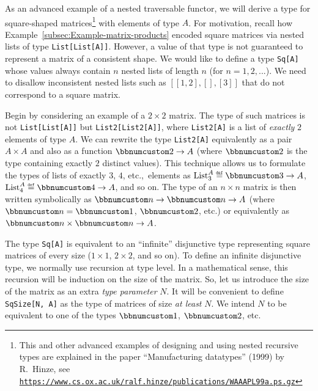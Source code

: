 As an advanced example of a nested traversable functor, we will derive
a type for square-shaped matrices\footnote{This and other advanced examples of designing and using nested recursive
types are explained in the paper \textsf{``}Manufacturing datatypes\textsf{''} (1999)
by R.~Hinze, see \texttt{\href{https://www.cs.ox.ac.uk/ralf.hinze/publications/WAAAPL99a.ps.gz}{https://www.cs.ox.ac.uk/ralf.hinze/publications/WAAAPL99a.ps.gz}}} with elements of type $A$. For motivation, recall how Example~\ref{subsec:Example-matrix-products}
encoded square matrices via nested lists of type \lstinline!List[List[A]]!.
However, a value of that type is not guaranteed to represent a matrix
of a consistent shape. We would like to define a type \lstinline!Sq[A]!
whose values always contain $n$ nested lists of length $n$ (for
$n=1,2,...$). We need to disallow inconsistent nested lists such
as $\left[\left[1,2\right],\left[\right],\left[3\right]\right]$ that
do not correspond to a square matrix.

Begin by considering an example of a $2\times2$ matrix. The type
of such matrices is not \lstinline!List[List[A]]! but \lstinline!List2[List2[A]]!,
where \lstinline!List2[A]! is a list of \emph{exactly} $2$ elements
of type $A$. We can rewrite the type \lstinline!List2[A]! equivalently
as a pair $A\times A$ and also as a function $\bbnum 2\rightarrow A$
(where $\bbnum 2$ is the type containing exactly $2$ distinct values).
This technique allows us to formulate the types of lists of exactly
$3$, $4$, etc.,~elements as $\text{List}_{3}^{A}\triangleq\bbnum 3\rightarrow A$,
$\text{List}_{4}^{A}\triangleq\bbnum 4\rightarrow A$, and so on.
The type of an $n\times n$ matrix is then written symbolically as
$\bbnum n\rightarrow\bbnum n\rightarrow A$ (where $\bbnum n=\bbnum 1$,
$\bbnum 2$, etc.) or equivalently as $\bbnum n\times\bbnum n\rightarrow A$.

The type \lstinline!Sq[A]! is equivalent to an \textsf{``}infinite\textsf{''} disjunctive
type representing square matrices of every size ($1\times1$, $2\times2$,
and so on). To define an infinite disjunctive type, we normally use
recursion at type level. In a mathematical sense, this recursion will
be induction on the size of the matrix. So, let us introduce the size
of the matrix as an extra \emph{type parameter} $N$. It will be convenient
to define \lstinline!SqSize[N, A]! as the type of matrices of size
\emph{at least} $N$. We intend $N$ to be equivalent to one of the
types $\bbnum 1$, $\bbnum 2$, etc. 

